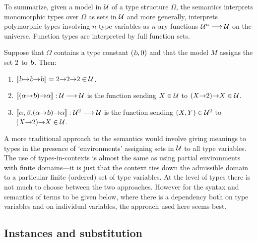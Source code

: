 To summarize, given a model in $\cal U$ of a type structure $\Omega$,
the semantics interprets monomorphic types over $\Omega$ as sets in
$\cal U$ and more generally, interprets polymorphic types involving $n$ type variables as $n$-ary functions ${\cal
U}^{n}\longrightarrow{\cal U}$ on the universe.  Function types are
interpreted by full function sets.

\medskip

Suppose that $\Omega$ contains a type constant $(\textsl{b},0)$ and that
the model $M$ assigns the set $\mbox{\rm 2}$ to $\textsl{b}$. Then:
\begin{enumerate}

\item $[\![\textsl{b}{\to}\textsl{b}{\to}\textsl{b}]\!]=\mbox{\rm 2}{\to}\mbox{\rm 2}{\to}\mbox{\rm 2}\in{\cal U}$.

\item $[\![(\alpha{\to}\textsl{b}){\to}\alpha]\!]:{\cal U}\longrightarrow{\cal U}$
is the function sending $X\in{\cal U}$ to $(X{\to}\mbox{\rm 2}){\to} X\in{\cal U}$.

\item $[\![\alpha,\beta . (\alpha{\to}\textsl{b}){\to}\alpha]\!]:{\cal
U}^{2}\longrightarrow{\cal U}$ is the function sending $(X,Y)\in{\cal
U}^{2}$ to $(X{\to}\mbox{\rm 2}){\to} X\in{\cal U}$.

\end{enumerate}

\medskip

A more traditional approach to the semantics would involve giving
meanings to types in the presence of `environments' assigning sets in
$\cal U$ to all type variables. The use of types-in-contexts is almost
the same as using partial environments with finite domains---it is
just that the context ties down the admissible domain to a particular
finite (ordered) set of type variables. At the level of types there is
not much to choose between the two approaches.  However for the syntax
and semantics of terms to be given below, where there is a dependency
both on type variables and on individual variables, the approach used
here seems best.

\subsection{Instances and substitution}
\label{instances-and-substitution}

